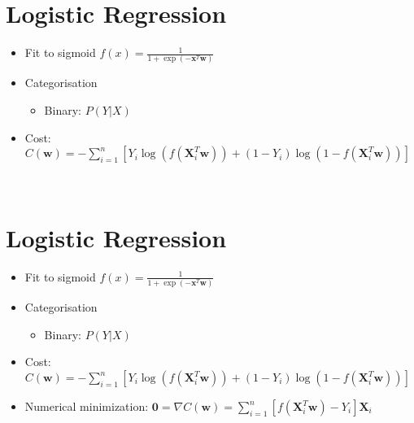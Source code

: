 \documentclass[11pt]{article}
\begin{document}
\newpage
\hypertarget{logistic-regression}{%
\section*{Logistic Regression}\label{logistic-regression4}}

\begin{itemize}
    \item Fit to sigmoid $f(x) = \frac{1}{1 + \exp(-\boldsymbol{x}^T\boldsymbol{w})}$
\end{itemize}
\begin{center}
\end{center}
\begin{itemize}
    \item Categorisation
        \begin{itemize}
            \item Binary: $P(Y|X)$
        \end{itemize}
    \item Cost: $C(\boldsymbol{w}) = -\sum\limits_{i=1}^n \left[Y_i\log\left(f\left(\boldsymbol{X}_i^T\boldsymbol{w}\right)\right) + (1 - Y_i)\log\left(1 - f\left(\boldsymbol{X}_i^T\boldsymbol{w}\right)\right)\right]$
\end{itemize}
{ \hspace*{\fill} \\}

\newpage
\hypertarget{logistic-regression}{%
\section*{Logistic Regression}\label{logistic-regression5}}

\begin{itemize}
    \item Fit to sigmoid $f(x) = \frac{1}{1 + \exp(-\boldsymbol{x}^T\boldsymbol{w})}$
\end{itemize}
\begin{center}
\end{center}
\begin{itemize}
    \item Categorisation
        \begin{itemize}
            \item Binary: $P(Y|X)$
        \end{itemize}
    \item Cost: $C(\boldsymbol{w}) = -\sum\limits_{i=1}^n \left[Y_i\log\left(f\left(\boldsymbol{X}_i^T\boldsymbol{w}\right)\right) + (1 - Y_i)\log\left(1 - f\left(\boldsymbol{X}_i^T\boldsymbol{w}\right)\right)\right]$
    \item Numerical minimization: $\boldsymbol{0} = \nabla C(\boldsymbol{w}) = \sum\limits_{i=1}^n\left[f\left(\boldsymbol{X}_i^T\boldsymbol{w}\right) - Y_i\right]\boldsymbol{X}_i$
\end{itemize}
{ \hspace*{\fill} \\}
\end{document}
